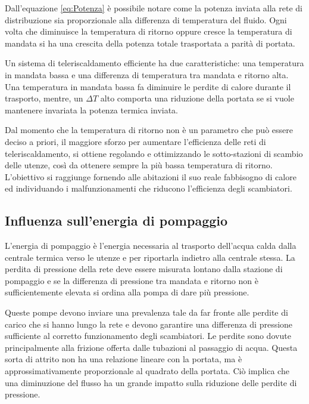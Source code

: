 \documentclass[laurea,oneside,11pt]{USiena_tesiLM}
\begin{document}
Dall'equazione \ref{eq:Potenza} è possibile notare come la potenza inviata alla rete di distribuzione sia proporzionale alla differenza di temperatura del fluido. Ogni volta che diminuisce la temperatura di ritorno oppure cresce la temperatura di mandata si ha una crescita della potenza totale trasportata a parità di portata.

Un sistema di teleriscaldamento efficiente ha due caratteristiche: una temperatura in mandata bassa e una differenza di temperatura tra mandata e ritorno alta. Una temperatura in mandata bassa fa diminuire le perdite di calore durante il trasporto, mentre, un $\Delta T$ alto comporta una riduzione della portata se si vuole mantenere invariata la potenza termica inviata.

Dal momento che la temperatura di ritorno non è un parametro che può essere deciso a priori, il maggiore sforzo per aumentare l'efficienza delle reti di teleriscaldamento, si ottiene regolando e ottimizzando le sotto-stazioni di scambio delle utenze, così da ottenere sempre la più bassa temperatura di ritorno. L'obiettivo si raggiunge fornendo alle abitazioni il suo reale fabbisogno di calore ed individuando i malfunzionamenti che riducono l'efficienza degli scambiatori. 
\subsection{Influenza sull'energia di pompaggio}
L'energia di pompaggio è l'energia necessaria al trasporto dell'acqua calda dalla centrale termica verso le utenze e per riportarla indietro alla centrale stessa. La perdita di pressione della rete deve essere misurata lontano dalla stazione di pompaggio e se la differenza di pressione tra mandata e ritorno non è sufficientemente elevata si ordina alla pompa di dare più pressione.

Queste pompe devono inviare una prevalenza tale da far fronte alle perdite di carico che si hanno lungo la rete e devono garantire una differenza di pressione sufficiente al corretto funzionamento degli scambiatori. Le perdite sono dovute principalmente alla frizione offerta dalle tubazioni al passaggio di acqua. Questa sorta di attrito non ha una relazione lineare con la portata, ma è approssimativamente proporzionale al quadrato della portata. Ciò implica che una diminuzione del flusso ha un grande impatto sulla riduzione delle perdite di pressione.
\end{document}
